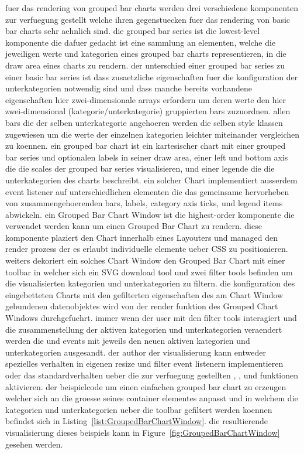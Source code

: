 fuer das rendering von grouped bar charts werden drei verschiedene komponenten zur verfuegung gestellt welche ihren gegenstuecken fuer das rendering von basic bar charts sehr aehnlich sind.
die grouped bar series ist die lowest-level komponente die dafuer gedacht ist eine sammlung an  elementen, welche die jeweiligen werte und kategorien eines grouped bar charts representieren, in die draw area eines charts zu rendern.
der unterschied einer grouped bar series zu einer basic bar series ist dass zusaetzliche eigenschaften fuer die konfiguration der unterkategorien notwendig sind und dass manche bereits vorhandene eigenschaften hier zwei-dimensionale arrays erfordern um deren werte den hier zwei-dimensional (kategorie/unterkategorie) gruppierten bars zuzuordnen.
allen bars die der selben unterkategorie angehoeren werden die selben style klassen zugewiesen um die werte der einzelnen kategorien leichter miteinander vergleichen zu koennen.
ein grouped bar chart ist ein kartesischer chart mit einer grouped bar series und optionalen labels in seiner draw area, einer left und bottom axis die die scales der grouped bar series visualisieren, und einer legende die die unterkategorien des charts beschreibt.
ein solcher Chart implementiert ausserdem event listener auf unterschiedlichen elementen die das gemeinsame hervorheben von zusammengehoerenden bars, labels, category axis ticks, und legend items abwickeln.  
ein Grouped Bar Chart Window ist die highest-order komponente die verwendet werden kann um einen Grouped Bar Chart zu rendern.
diese komponente plaziert den Chart innerhalb eines Layouters und managed den render prozess der es erlaubt individuelle elemente ueber CSS zu positionieren.
weiters dekoriert ein solches Chart Window den Grouped Bar Chart mit einer toolbar in welcher sich ein SVG download tool und zwei filter tools befinden um die visualisierten kategorien und unterkategorien zu filtern.
die konfiguration des eingebetteten Charts mit den gefilterten eigenschaften des am Chart Window gebundenen datenobjektes wird von der render funktion des Grouped Chart Windows durchgefuehrt.
immer wenn der user mit den filter tools interagiert und die zusammenstellung der aktiven kategorien und unterkategorien veraendert werden die  und  events mit jeweils den neuen aktiven kategorien und unterkategorien ausgesandt.
der author der visualisierung kann entweder spezielles verhalten in eigenen resize und filter event listenern implementieren oder das standardverhalten ueber die zur verfuegung gestellten , , und  funktionen aktivieren.
der beispielcode um einen einfachen grouped bar chart zu erzeugen welcher sich an die groesse seines container elementes anpasst und in welchem die kategorien und unterkategorien ueber die toolbar gefiltert werden koennen befindet sich in Listing~\ref{list:GroupedBarChartWindow}.
die resultierende visualisierung dieses beispiels kann in Figure~\ref{fig:GroupedBarChartWindow} gesehen werden.  

